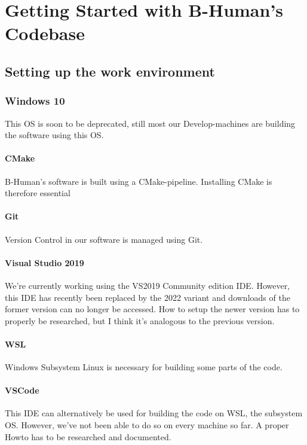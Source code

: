 \section{Getting Started with B-Human's Codebase}

\subsection{Setting up the work environment}

\subsubsection{Windows 10}

This OS is soon to be deprecated, still most our Develop-machines are building the software using this OS.

\paragraph{CMake} B-Human's software is built using a CMake-pipeline. Installing CMake is therefore essential

\paragraph{Git} Version Control in our software is managed using Git.

\paragraph{Visual Studio 2019} We're currently working using the VS2019 Community edition IDE. However, this IDE has recently been replaced by the 2022 variant and downloads of the former version can no longer be accessed. How to setup the newer version has to properly be researched, but I think it's analogous to the previous version.

\paragraph{WSL} Windows Subsystem Linux is necessary for building some parts of the code.

\paragraph{VSCode} This IDE can alternatively be used for building the code on WSL, the subsystem OS. However, we've not been able to do so on every machine so far. A proper Howto has to be researched and documented.

